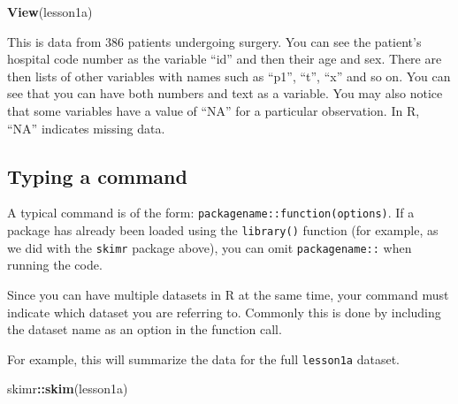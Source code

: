 \documentclass[]{book}
\newenvironment{Shaded}{\begin{snugshade}}{\end{snugshade}}
\newcommand{\KeywordTok}[1]{\textcolor[rgb]{0.13,0.29,0.53}{\textbf{#1}}}
\newcommand{\NormalTok}[1]{#1}
\newcommand{\OperatorTok}[1]{\textcolor[rgb]{0.81,0.36,0.00}{\textbf{#1}}}
\begin{document}
\begin{Shaded}
\begin{Highlighting}[]
\KeywordTok{View}\NormalTok{(lesson1a)}
\end{Highlighting}
\end{Shaded}

This is data from 386 patients undergoing surgery. You can see the patient's hospital code number as the variable ``id'' and then their age and sex. There are then lists of other variables with names such as ``p1'', ``t'', ``x'' and so on. You can see that you can have both numbers and text as a variable. You may also notice that some variables have a value of ``NA'' for a particular observation. In R, ``NA'' indicates missing data.

\hypertarget{typing-a-command}{%
\subsection{Typing a command}\label{typing-a-command}}

A typical command is of the form: \texttt{packagename::function(options)}. If a package has already been loaded using the \texttt{library()} function (for example, as we did with the \texttt{skimr} package above), you can omit \texttt{packagename::} when running the code.

Since you can have multiple datasets in R at the same time, your command must indicate which dataset you are referring to. Commonly this is done by including the dataset name as an option in the function call.

For example, this will summarize the data for the full \texttt{lesson1a} dataset.

\begin{Shaded}
\begin{Highlighting}[]
\NormalTok{skimr}\OperatorTok{::}\KeywordTok{skim}\NormalTok{(lesson1a)}
\end{Highlighting}
\end{Shaded}
\end{document}
